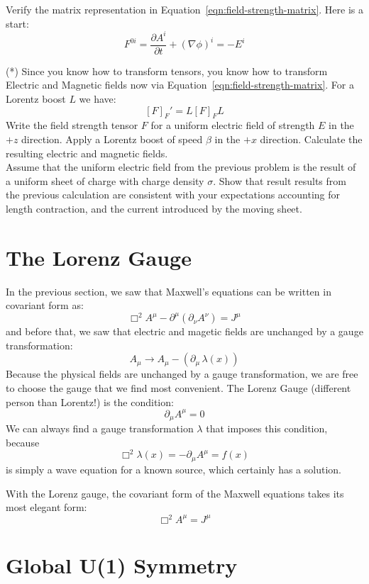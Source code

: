 \documentclass[12pt]{article}
\begin{document}
\exercise Verify the matrix representation in
Equation~\ref{eqn:field-strength-matrix}.  Here is a start:
$$F^{0i} = \frac{\partial A^i}{\partial t} + (\nabla \phi)^i = -E^i$$

\exercise (*) Since you know how to transform tensors, you know how to
transform Electric and Magnetic fields now via
Equation~\ref{eqn:field-strength-matrix}.  For a Lorentz boost $L$ we
have:
$$[F]_F' = L [F]_F L$$
Write the field strength tensor $F$ for a uniform electric field of
strength $E$ in the $+z$ direction.  Apply a Lorentz boost of speed
$\beta$ in the $+x$ direction.  Calculate the resulting electric and
magnetic fields.\\[5pt]

\exercise Assume that the uniform electric field from the previous
problem is the result of a uniform sheet of charge with charge density
$\sigma$.  Show that result results from the previous calculation are
consistent with your expectations accounting for length contraction,
and the current introduced by the moving sheet.

\section{The Lorenz Gauge}

In the previous section, we saw that Maxwell's equations can be
written in covariant form as:
$$\Box^2 A^\mu - \partial^\mu( \partial_\nu A^\nu) = J^\mu$$  
and before that, we saw that electric and magetic fields are unchanged by a gauge transformation:
$$A_\mu \to A_\mu - (\partial_\mu \, \lambda(x))$$
Because the physical fields are unchanged by a gauge transformation,
we are free to choose the gauge that we find most convenient.  The
Lorenz Gauge (different person than Lorentz!) is the condition:
$$\partial_\mu A^\mu = 0$$
We can always find a gauge transformation $\lambda$ that imposes this condition, because
$$\Box^2 \lambda(x) = -\partial_\mu A^\mu = f(x)$$
is simply a wave equation for a known source, which certainly has a
solution.

With the Lorenz gauge, the covariant form of the Maxwell equations takes its most elegant form:
\begin{equation}
\label{eqn:maxwell-lorenz}
\Box^2 A^\mu = J^\mu  
\end{equation}

\section{Global U(1) Symmetry}
\end{document}

